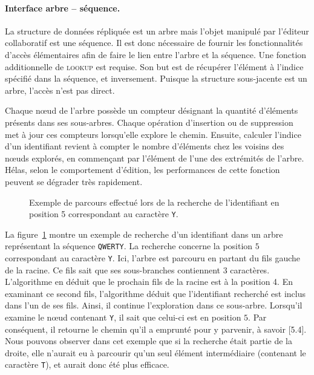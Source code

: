 \paragraph{Interface arbre -- séquence.} La structure de données répliquée est
un arbre mais l'objet manipulé par l'éditeur collaboratif est une séquence. Il
est donc nécessaire de fournir les fonctionnalités d'accès élémentaires afin de
faire le lien entre l'arbre et la séquence. Une fonction additionnelle de
\textsc{lookup} est requise. Son but est de récupérer l'élément à l'indice
spécifié dans la séquence, et inversement. Puisque la structure sous-jacente est
un arbre, l'accès n'est pas direct.

\noindent Chaque nœud de l'arbre possède un compteur désignant la quantité
d'éléments présents dans ses sous-arbres. Chaque opération d'insertion ou de
suppression met à jour ces compteurs lorsqu'elle explore le chemin. Ensuite,
calculer l'indice d'un identifiant revient à compter le nombre d'éléments chez
les voisins des nœuds explorés, en commençant par l'élément de l'une des
extrémités de l'arbre. Hélas, selon le comportement d'édition, les performances
de cette fonction peuvent se dégrader très rapidement.

\begin{figure}
  \centering
  
  \caption[Recherche d'identifiants dans l'arbre] {\label{repl:fig:getexample}
    Exemple de parcours effectué lors de la recherche de l'identifiant en
    position 5 correspondant au caractère \texttt{Y}.}
\end{figure}

\noindent La figure~\ref{repl:fig:getexample} montre un exemple de recherche
d'un identifiant dans un arbre représentant la séquence \texttt{QWERTY}. La
recherche concerne la position $5$ correspondant au caractère \texttt{Y}. Ici,
l'arbre est parcouru en partant du fils gauche de la racine. Ce fils sait que
ses sous-branches contiennent 3 caractères. L'algorithme en déduit que le
prochain fils de la racine est à la position 4. En examinant ce second fils,
l'algorithme déduit que l'identifiant recherché est inclus dans l'un de ses
fils. Ainsi, il continue l'exploration dans ce sous-arbre. Lorsqu'il examine le
nœud contenant \texttt{Y}, il sait que celui-ci est en position $5$. Par
conséquent, il retourne le chemin qu'il a emprunté pour y parvenir, à savoir
[5.4]. Nous pouvons observer dans cet exemple que si la recherche était partie
de la droite, elle n'aurait eu à parcourir qu'un seul élément intermédiaire
(contenant le caractère \texttt{T}), et aurait donc été plus efficace.

